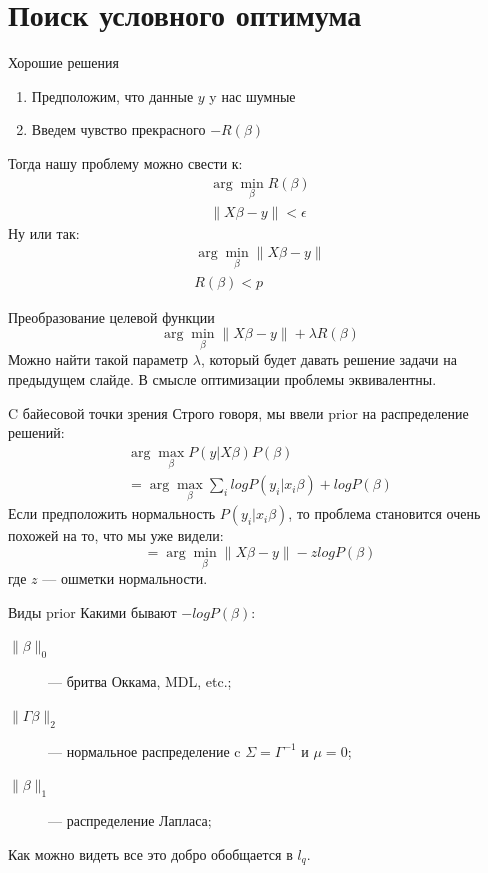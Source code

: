 \documentclass[14pt, fleqn, xcolor={dvipsnames, table}]{beamer}
\begin{document}
\section{Поиск условного оптимума}
\begin{frame}{Хорошие решения}
\begin{enumerate}
  \item Предположим, что данные $y$ y нас шумные
  \item Введем чувство прекрасного $-R(\beta)$ 
\end{enumerate}
Тогда нашу проблему можно свести к:
$$\begin{array}{l}
\arg \min_\beta R(\beta) \\
\| X\beta - y\| < \epsilon
\end{array}$$
Ну или так:
$$\begin{array}{l}
\arg \min_\beta \| X\beta - y\| \\
R(\beta) < p
\end{array}$$
\end{frame}

\begin{frame}{Преобразование целевой функции}
$$
\arg \min_\beta \| X\beta - y\| + \lambda R(\beta)
$$
Можно найти такой параметр $\lambda$, который будет давать решение задачи на предыдущем слайде. В смысле оптимизации проблемы эквивалентны.
\end{frame}


\begin{frame}{C байесовой точки зрения}
Строго говоря, мы ввели prior на распределение решений:
$$\begin{array}{l}
\arg \max_\beta P(y|X\beta) P(\beta) \\
= \arg \max_\beta \sum_i log P(y_i|x_i\beta) + log P(\beta)
\end{array}$$
Если предположить нормальность $P(y_i|x_i\beta)$, то проблема становится очень похожей на то, что мы уже видели:
$$
= \arg \min_\beta \|X \beta - y\| - z log P(\beta)
$$
где $z$ --- ошметки нормальности.
\end{frame}

\begin{frame}{Виды prior}
Какими бывают $-log P(\beta)$:
\begin{description}
  \item[$\|\beta\|_0$] --- бритва Оккама, MDL, etc.;
  \item[$\|\Gamma\beta\|_2$] --- нормальное распределение c $\Sigma = \Gamma^{-1}$ и $\mu = 0$;
  \item[$\|\beta\|_1$] --- распределение Лапласа;
\end{description}
Как можно видеть все это добро обобщается в $l_q$.
\end{frame}
\end{document}
